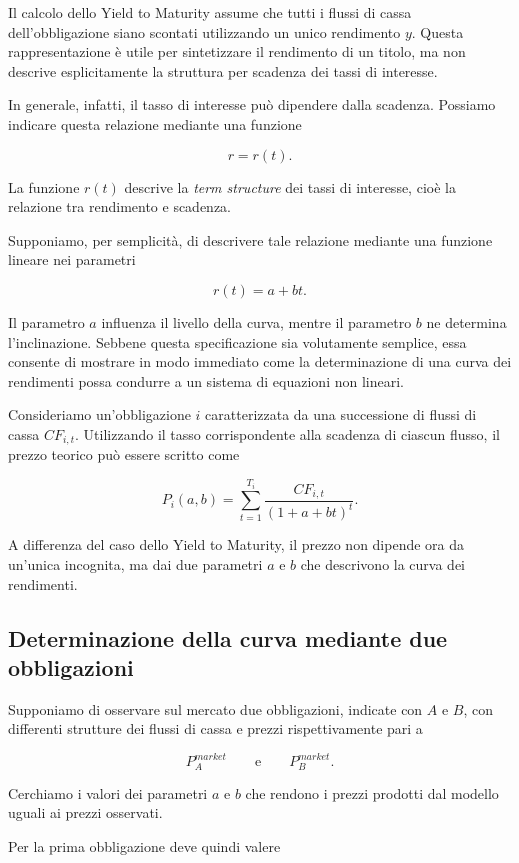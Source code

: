 Il calcolo dello Yield to Maturity assume che tutti i flussi di cassa dell'obbligazione siano scontati utilizzando un unico rendimento $y$. Questa rappresentazione è utile per sintetizzare il rendimento di un titolo, ma non descrive esplicitamente la struttura per scadenza dei tassi di interesse.

In generale, infatti, il tasso di interesse può dipendere dalla scadenza. Possiamo indicare questa relazione mediante una funzione

\[
r=r(t).
\]

La funzione $r(t)$ descrive la \emph{term structure} dei tassi di interesse, cioè la relazione tra rendimento e scadenza.

Supponiamo, per semplicità, di descrivere tale relazione mediante una funzione lineare nei parametri

\[
r(t)=a+bt.
\]

Il parametro $a$ influenza il livello della curva, mentre il parametro $b$ ne determina l'inclinazione. Sebbene questa specificazione sia volutamente semplice, essa consente di mostrare in modo immediato come la determinazione di una curva dei rendimenti possa condurre a un sistema di equazioni non lineari.

Consideriamo un'obbligazione $i$ caratterizzata da una successione di flussi di cassa $CF_{i,t}$. Utilizzando il tasso corrispondente alla scadenza di ciascun flusso, il prezzo teorico può essere scritto come

\[
P_i(a,b)
=
\sum_{t=1}^{T_i}
\frac{CF_{i,t}}
{(1+a+bt)^t}.
\]

A differenza del caso dello Yield to Maturity, il prezzo non dipende ora da un'unica incognita, ma dai due parametri $a$ e $b$ che descrivono la curva dei rendimenti.

\subsection{Determinazione della curva mediante due obbligazioni}

Supponiamo di osservare sul mercato due obbligazioni, indicate con $A$ e $B$, con differenti strutture dei flussi di cassa e prezzi rispettivamente pari a

\[
P_A^{market}
\qquad \text{e} \qquad
P_B^{market}.
\]

Cerchiamo i valori dei parametri $a$ e $b$ che rendono i prezzi prodotti dal modello uguali ai prezzi osservati.

Per la prima obbligazione deve quindi valere

